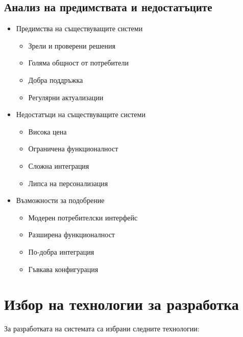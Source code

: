\documentclass[12pt,a4paper]{article}
\begin{document}
\subsection{Анализ на предимствата и недостатъците}
\begin{itemize}
    \item Предимства на съществуващите системи
    \begin{itemize}
        \item Зрели и проверени решения
        \item Голяма общност от потребители
        \item Добра поддръжка
        \item Регулярни актуализации
    \end{itemize}
    
    \item Недостатъци на съществуващите системи
    \begin{itemize}
        \item Висока цена
        \item Ограничена функционалност
        \item Сложна интеграция
        \item Липса на персонализация
    \end{itemize}
    
    \item Възможности за подобрение
    \begin{itemize}
        \item Модерен потребителски интерфейс
        \item Разширена функционалност
        \item По-добра интеграция
        \item Гъвкава конфигурация
    \end{itemize}
\end{itemize}

\section{Избор на технологии за разработка}
За разработката на системата са избрани следните технологии:
\end{document}
